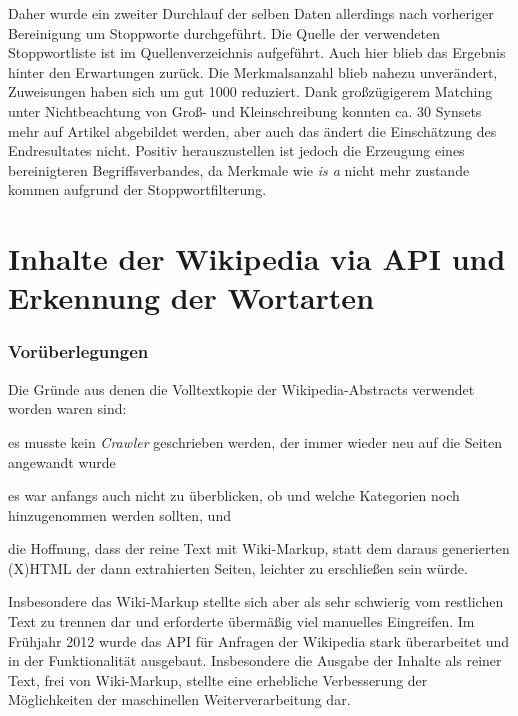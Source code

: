 \documentclass[pagesize,paper=A4,DIV=calc,fontsize=12pt,draft=false]{scrreprt}
\begin{document}
Daher wurde ein zweiter Durchlauf der selben Daten allerdings nach vorheriger Bereinigung um Stoppworte durchgeführt. 
Die Quelle der verwendeten Stoppwortliste ist im Quellenverzeichnis aufgeführt. 
Auch hier blieb das Ergebnis hinter den Erwartungen zurück. 
Die Merkmalsanzahl blieb nahezu unverändert, Zuweisungen haben sich um gut 1000 reduziert. 
Dank großzügigerem Matching unter Nichtbeachtung von Groß- und Kleinschreibung konnten ca. 30 Synsets mehr auf Artikel abgebildet werden, aber auch das ändert die Einschätzung des Endresultates nicht. 
Positiv herauszustellen ist jedoch die Erzeugung eines bereinigteren Begriffsverbandes, da Merkmale wie \emph{is a} nicht mehr zustande kommen aufgrund der Stoppwortfilterung. 

\section{Inhalte der Wikipedia via API und Erkennung der Wortarten}

\subsubsection{Vorüberlegungen}

Die Gründe aus denen die Volltextkopie der Wikipedia-Abstracts verwendet worden waren sind: 
\begin{inparaenum}
\item es musste kein \emph{Crawler} geschrieben werden, der immer wieder neu auf die Seiten angewandt wurde
\item es war anfangs auch nicht zu überblicken, ob und welche Kategorien noch hinzugenommen werden sollten, und 
\item die Hoffnung, dass der reine Text mit Wiki-Markup, statt dem daraus generierten (X)HTML der dann extrahierten Seiten, leichter zu erschließen sein würde.
\end{inparaenum}

Insbesondere das Wiki-Markup stellte sich aber als sehr schwierig vom restlichen Text zu trennen dar und erforderte übermäßig viel manuelles Eingreifen. 
Im Frühjahr 2012 wurde das API für Anfragen der Wikipedia stark überarbeitet und in der Funktionalität ausgebaut. 
Insbesondere die Ausgabe der Inhalte als reiner Text, frei von Wiki-Markup, stellte eine erhebliche Verbesserung der Möglichkeiten der maschinellen Weiterverarbeitung dar. 
\end{document}

